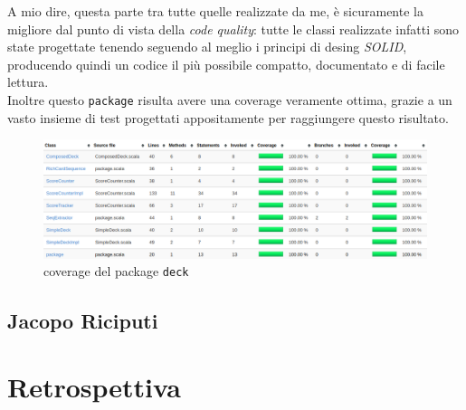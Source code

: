 \begin{itemize}
	A mio dire, questa parte tra tutte quelle realizzate da me, è sicuramente la migliore dal punto di vista della \textit{code quality}: tutte le classi realizzate infatti sono state progettate tenendo seguendo al meglio i principi di desing \textit{SOLID}, producendo quindi un codice il più possibile compatto, documentato e di facile lettura.\\
	Inoltre questo \texttt{package} risulta avere una coverage veramente ottima, grazie a un vasto insieme di test progettati appositamente per raggiungere questo risultato. 
	
	\begin{figure}[H]
		\includegraphics[width=\textwidth,height=\textheight,keepaspectratio]{deckCoverage}
		\caption{coverage del package \texttt{deck}}
	\end{figure}
	

\end{itemize}


        \subsection{Jacopo Riciputi}\label{subsec:riciputi}

        \clearpage

    \section{Retrospettiva}\label{sec:retrospective}


